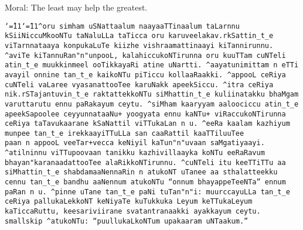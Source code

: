 \smallskip

Moral: The least may help the greatest.

\bigskip

{\raggedright\tt\catcode`\^=11\catcode`\~=11\dollar ^oru simham uSNattaalum naayaaTTinaalum taLarnnu kSiiNiccuMkooNTu 
taNaluLLa taTicca oru karuveelakav.rkSattin\_t\_e viTarnnataaya konpukaLuTe 
kiizhe vishraamattinaayi kiTannirunnu. ^aviTe kiTannuRan"n"unpooL, 
kalahiccukoNTirunna oru kuuTTam cuNTeli atin\_t\_e muukkinmeel 
ooTikkayaRi atine uNartti. ^aayatunimittam n~eTTi avayil onnine tan\_t\_e 
kaikoNTu piTiccu kollaaRaakki. ^appooL ceRiya cuNTeli vaLaree 
vyasanattooTee karuNakk apeekSiccu. ^itra ceRiya nik.rSTajantuvin\_t\_e
raktattekkoNTu siMhattin\_t\_e kuliinatakku bhaMgam varuttarutu ennu paRakayum
ceytu. ^siMham kaaryyam aaloociccu atin\_t\_e apeekSapoolee ceyyunnataaNu+
yoogyata ennu kaNTu+ viRaccukoNTirunna ceRiya taTavukaarane kSaNattil
viTTukaLan~n~u. ^eeRa kaalam kazhiyum munpee tan\_t\_e irekkaayiTTuLLa
san~caaRattil kaaTTiluuTee paan~n~appooL veeTar+vecca keNiyil
kaTun"n"uvaan saMgatiyaayi. ^atilninnu viTTupoovaan tanikku kazhivillaayka
koNTu eeRaRavum bhayan"karanaadattooTee alaRikkoNTirunnu.
^cuNTeli itu keeTTiTTu aa siMhattin\_t\_e shabdamaaNennaRin~n~atukoNT
uTanee aa sthalatteekku cennu tan\_t\_e bandhu aaNennum atukoNTu 
``onnum bhayappeTeeNTa'' ennum paRan~n~u. ^pinne uTane
tan\_t\_e paNi tuTan"n"i: muurccayuLLa tan\_t\_e ceRiya pallukaLekkoNT
keNiyaTe kuTukkuka Leyum keTTukaLeyum kaTiccaRuttu, keesariviirane
svatantranaakki ayakkayum ceytu.
\smallskip
\bslash smallskip
\smallskip
^atukoNTu: ``puullukaL{}koNTum upakaaram uNTaakum.''
\dollar
}
\endinput

